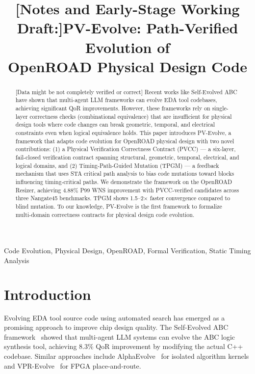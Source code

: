 \documentclass[conference]{IEEEtran}
\title{[Notes and Early-Stage Working Draft:]PV-Evolve: Path-Verified Evolution of\\OpenROAD Physical Design Code}
\author{
\IEEEauthorblockN{Kavya Kumar Agrawal}
\IEEEauthorblockA{Indian Institute of Technology\\
a.kavya@iitg.ac.in}
}
\begin{document}
\maketitle

\begin{abstract}
[Data might be not completely verified or correct] Recent works like Self-Evolved ABC have shown that multi-agent LLM frameworks can evolve EDA tool codebases, achieving significant QoR improvements. However, these frameworks rely on single-layer correctness checks (combinational equivalence) that are insufficient for physical design tools where code changes can break geometric, temporal, and electrical constraints even when logical equivalence holds. This paper introduces PV-Evolve, a framework that adapts code evolution for OpenROAD physical design with two novel contributions: (1) a Physical Verification Correctness Contract (PVCC) --- a six-layer, fail-closed verification contract spanning structural, geometric, temporal, electrical, and logical domains, and (2) Timing-Path-Guided Mutation (TPGM) --- a feedback mechanism that uses STA critical path analysis to bias code mutations toward blocks influencing timing-critical paths. We demonstrate the framework on the OpenROAD Resizer, achieving 4.88\% P99 WNS improvement with PVCC-verified candidates across three Nangate45 benchmarks. TPGM shows 1.5--2$\times$ faster convergence compared to blind mutation. To our knowledge, PV-Evolve is the first framework to formalize multi-domain correctness contracts for physical design code evolution.
\end{abstract}

\begin{IEEEkeywords}
Code Evolution, Physical Design, OpenROAD, Formal Verification, Static Timing Analysis
\end{IEEEkeywords}

\section{Introduction}

Evolving EDA tool source code using automated search has emerged as a promising approach to improve chip design quality. The Self-Evolved ABC framework~\cite{self-evolved-abc} showed that multi-agent LLM systems can evolve the ABC logic synthesis tool, achieving 8.3\% QoR improvement by modifying the actual C++ codebase. Similar approaches include AlphaEvolve~\cite{alphaevolve} for isolated algorithm kernels and VPR-Evolve~\cite{vpr-evolve} for FPGA place-and-route.
\end{document}
